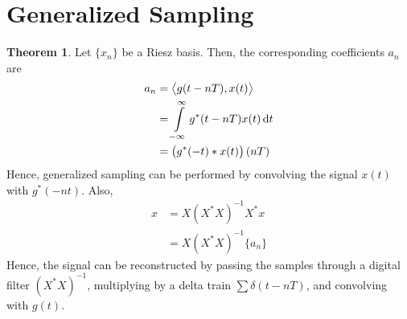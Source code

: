 \documentclass[titlepage, fleqn, a4paper, 12pt, twoside]{article}
\theoremstyle{definition}
\theoremstyle{theorem}
\newtheorem{theorem}{Theorem}
\begin{document}
\section{Generalized Sampling}

\begin{theorem}
	Let $\{x_n\}$ be a Riesz basis.
	Then, the corresponding coefficients $a_n$ are
	\begin{align*}
		a_n &= \left\langle g(t - n T) , x(t) \right\rangle\\
		&= \int\limits_{-\infty}^{\infty} g^*(t - n T) x(t) \dif t\\
		&= \left( g^*(-t) \ast x(t) \right)(n T)
	\end{align*}
	Hence, generalized sampling can be performed by convolving the signal $x(t)$ with $g^*(-n t)$.
	Also,
	\begin{align*}
		x &= X \left( X^* X \right)^{-1} X^* x\\
		&= X \left( X^* X \right)^{-1} \{a_n\}
	\end{align*}
	Hence, the signal can be reconstructed by passing the samples through a digital filter $\left( X^* X \right)^{-1}$, multiplying by a delta train $\sum \delta(t - n T)$, and convolving with $g(t)$.
\end{theorem}
\end{document}
